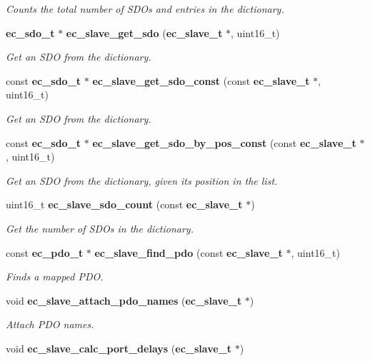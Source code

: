 \begin{DoxyCompactItemize}
\begin{DoxyCompactList}\small\item\em \-Counts the total number of \-S\-D\-Os and entries in the dictionary. \end{DoxyCompactList}\item 
{\bf ec\-\_\-sdo\-\_\-t} $\ast$ {\bf ec\-\_\-slave\-\_\-get\-\_\-sdo} ({\bf ec\-\_\-slave\-\_\-t} $\ast$, uint16\-\_\-t)
\begin{DoxyCompactList}\small\item\em \-Get an \-S\-D\-O from the dictionary. \end{DoxyCompactList}\item 
const {\bf ec\-\_\-sdo\-\_\-t} $\ast$ {\bf ec\-\_\-slave\-\_\-get\-\_\-sdo\-\_\-const} (const {\bf ec\-\_\-slave\-\_\-t} $\ast$, uint16\-\_\-t)
\begin{DoxyCompactList}\small\item\em \-Get an \-S\-D\-O from the dictionary. \end{DoxyCompactList}\item 
const {\bf ec\-\_\-sdo\-\_\-t} $\ast$ {\bf ec\-\_\-slave\-\_\-get\-\_\-sdo\-\_\-by\-\_\-pos\-\_\-const} (const {\bf ec\-\_\-slave\-\_\-t} $\ast$, uint16\-\_\-t)
\begin{DoxyCompactList}\small\item\em \-Get an \-S\-D\-O from the dictionary, given its position in the list. \end{DoxyCompactList}\item 
uint16\-\_\-t {\bf ec\-\_\-slave\-\_\-sdo\-\_\-count} (const {\bf ec\-\_\-slave\-\_\-t} $\ast$)
\begin{DoxyCompactList}\small\item\em \-Get the number of \-S\-D\-Os in the dictionary. \end{DoxyCompactList}\item 
const {\bf ec\-\_\-pdo\-\_\-t} $\ast$ {\bf ec\-\_\-slave\-\_\-find\-\_\-pdo} (const {\bf ec\-\_\-slave\-\_\-t} $\ast$, uint16\-\_\-t)
\begin{DoxyCompactList}\small\item\em \-Finds a mapped \-P\-D\-O. \end{DoxyCompactList}\item 
void {\bf ec\-\_\-slave\-\_\-attach\-\_\-pdo\-\_\-names} ({\bf ec\-\_\-slave\-\_\-t} $\ast$)\label{slave_8h_a19149abe080d35cfd2e6bd6f6bef00b1}

\begin{DoxyCompactList}\small\item\em \-Attach \-P\-D\-O names. \end{DoxyCompactList}\item 
void {\bf ec\-\_\-slave\-\_\-calc\-\_\-port\-\_\-delays} ({\bf ec\-\_\-slave\-\_\-t} $\ast$)\label{slave_8h_abe9fa7fdd6ee65108792f13eaa574d76}


\end{DoxyCompactItemize}

